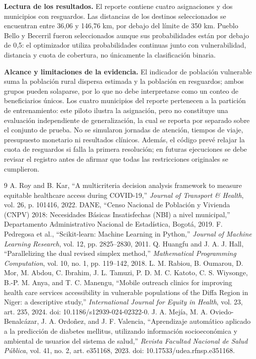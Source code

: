 \documentclass[12pt]{article}
\begin{document}
\textbf{Lectura de los resultados.} El reporte contiene cuatro asignaciones y dos municipios con resguardos. Las distancias de los destinos seleccionados se encuentran entre 36,06 y 146,76 km, por debajo del límite de 350 km. Pueblo Bello y Becerril fueron seleccionados aunque sus probabilidades están por debajo de 0,5: el optimizador utiliza probabilidades continuas junto con vulnerabilidad, distancia y cuota de cobertura, no únicamente la clasificación binaria.

\textbf{Alcance y limitaciones de la evidencia.} El indicador de población vulnerable suma la población rural dispersa estimada y la población en resguardos; ambos grupos pueden solaparse, por lo que no debe interpretarse como un conteo de beneficiarios únicos. Los cuatro municipios del reporte pertenecen a la partición de entrenamiento: este piloto ilustra la asignación, pero no constituye una evaluación independiente de generalización, la cual se reporta por separado sobre el conjunto de prueba. No se simularon jornadas de atención, tiempos de viaje, presupuesto monetario ni resultados clínicos. Además, el código prevé relajar la cuota de resguardos si falla la primera resolución; en futuras ejecuciones se debe revisar el registro antes de afirmar que todas las restricciones originales se cumplieron.

\renewcommand{\refname}{Referencias Bibliográficas}
{\small
\setlength{\itemsep}{2pt}
\begin{thebibliography}{9}
\setlength{\itemsep}{0pt}
\setlength{\parsep}{0pt}
     A. Roy and B. Kar, ``A multicriteria decision analysis framework to measure equitable healthcare access during COVID-19,'' \textit{Journal of Transport \& Health}, vol. 26, p. 101416, 2022.
     DANE, ``Censo Nacional de Población y Vivienda (CNPV) 2018: Necesidades Básicas Insatisfechas (NBI) a nivel municipal,'' Departamento Administrativo Nacional de Estadística, Bogotá, 2019.
     F. Pedregosa et al., ``Scikit-learn: Machine Learning in Python,'' \textit{Journal of Machine Learning Research}, vol. 12, pp. 2825--2830, 2011.
     Q. Huangfu and J. A. J. Hall, ``Parallelizing the dual revised simplex method,'' \textit{Mathematical Programming Computation}, vol. 10, no. 1, pp. 119--142, 2018.
     L. M. Rabiou, B. Oumarou, D. Mor, M. Abdou, C. Ibrahim, J. L. Tamuzi, P. D. M. C. Katoto, C. S. Wiysonge, B.-P. M. Anya, and T. C. Manengu, ``Mobile outreach clinics for improving health care services accessibility in vulnerable populations of the Diffa Region in Niger: a descriptive study,'' \textit{International Journal for Equity in Health}, vol. 23, art. 235, 2024. doi: 10.1186/s12939-024-02322-0.
     J. A. Mejía, M. A. Oviedo-Benalcázar, J. A. Ordoñez, and J. F. Valencia, ``Aprendizaje automático aplicado a la predicción de diabetes mellitus, utilizando información socioeconómica y ambiental de usuarios del sistema de salud,'' \textit{Revista Facultad Nacional de Salud Pública}, vol. 41, no. 2, art. e351168, 2023. doi: 10.17533/udea.rfnsp.e351168.
\end{thebibliography}
}
\end{document}
